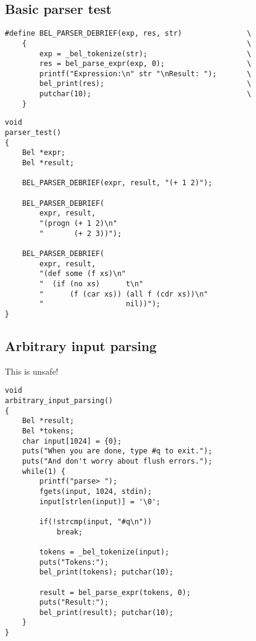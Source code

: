 \documentclass[openright,a4paper,twoside,12pt]{memoir}
\begin{document}
\subsection{Basic parser test}
\label{sec:org8ccdde0}

\begin{verbatim}
#define BEL_PARSER_DEBRIEF(exp, res, str)               \
    {                                                   \
        exp = _bel_tokenize(str);                       \
        res = bel_parse_expr(exp, 0);                   \
        printf("Expression:\n" str "\nResult: ");       \
        bel_print(res);                                 \
        putchar(10);                                    \
    }
\end{verbatim}

\begin{verbatim}
void
parser_test()
{
    Bel *expr;
    Bel *result;
    
    BEL_PARSER_DEBRIEF(expr, result, "(+ 1 2)");

    BEL_PARSER_DEBRIEF(
        expr, result,
        "(progn (+ 1 2)\n"
        "       (+ 2 3))");

    BEL_PARSER_DEBRIEF(
        expr, result,
        "(def some (f xs)\n"
        "  (if (no xs)      t\n"
        "      (f (car xs)) (all f (cdr xs))\n"
        "                   nil))");
}
\end{verbatim}

\subsection{Arbitrary input parsing}
\label{sec:org6fd1e72}

This is unsafe!

\begin{verbatim}
void
arbitrary_input_parsing()
{
    Bel *result;
    Bel *tokens;
    char input[1024] = {0};
    puts("When you are done, type #q to exit.");
    puts("And don't worry about flush errors.");
    while(1) {
        printf("parse> ");
        fgets(input, 1024, stdin);
        input[strlen(input)] = '\0';

        if(!strcmp(input, "#q\n"))
            break;

        tokens = _bel_tokenize(input);
        puts("Tokens:");
        bel_print(tokens); putchar(10);

        result = bel_parse_expr(tokens, 0);
        puts("Result:");
        bel_print(result); putchar(10);
    }
}
\end{verbatim}
\end{document}
